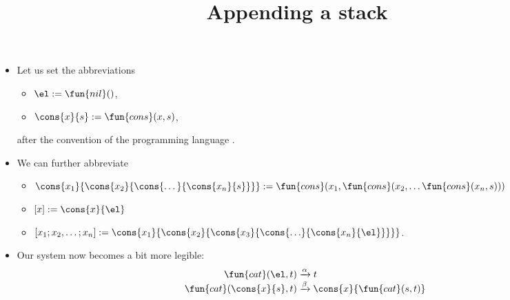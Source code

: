 \documentclass[wide]{slides}
\begin{document}
\begin{slide}
  \title{Appending a stack}

  \begin{itemize}

    \item Let us set the abbreviations
      \begin{itemize}

        \item \(\el := \fun{nil}()\),

        \item \(\cons{x}{s} := \fun{cons}(x,s)\),

      \end{itemize}
      after the convention of the programming language \OCaml.
      \medskip

    \item We can further abbreviate
      \begin{itemize}

        \item \(\cons{x_1}{\cons{x_2}{\cons{\dots}{\cons{x_n}{s}}}} :=
          \fun{cons}(x_1, \fun{cons}(x_2, \dots \fun{cons}(x_n,s)))\)

        \item \([x] := \cons{x}{\el}\)

        \item \([x_1; x_2, \dots; x_n] :=
          \cons{x_1}{\cons{x_2}{\cons{x_3}{\cons{\ldots}{\cons{x_n}{\el}}}}}\).
      \end{itemize}
      \medskip

    \item Our system now becomes a bit more legible:
      \bigskip
      \begin{align*}
        \fun{cat}(        \el,t) &\xrightarrow{\alpha} t\\
        \fun{cat}(\cons{x}{s},t) &\xrightarrow{\smash{\beta}}
        \cons{x}{\fun{cat}(s,t)}
      \end{align*}

  \end{itemize}

\end{slide}
\end{document}
